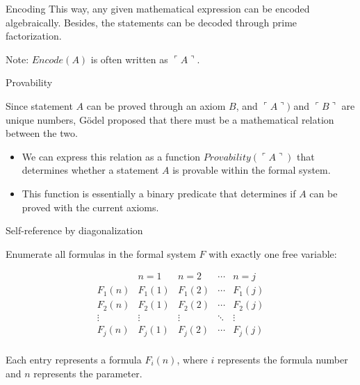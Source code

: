 \documentclass[final]{beamer}
\newlength{\colwidth}
\begin{document}
\begin{frame}[t]
\begin{columns}[t]
\begin{column}{\colwidth}
\begin{block}{Encoding}
    This way, any given mathematical expression can be encoded algebraically. Besides, the statements can be decoded through prime factorization.

    Note: $Encode(A)$ is often written as $\ulcorner \!A \urcorner$.

  \end{block}

 \begin{block}{Provability}

Since statement $A$ can be proved through an axiom $B$, and $\ulcorner \!A \urcorner)$ and $\ulcorner \!B \urcorner$ are unique numbers, Gödel proposed that there must be a mathematical relation between the two.

 \begin{itemize}
    
    \item We can express this relation as a function $Provability(\ulcorner \!A \urcorner)$ that determines whether a statement $A$ is provable within the formal system.
    
    \item This function is essentially a binary predicate that determines if $A$ can be proved with the current axioms.
    
    \end{itemize}

 \end{block}


 \begin{block}{Self-reference by diagonalization}

    Enumerate all formulas in the formal system $F$ with exactly one free variable:
    
    \[
    \begin{array}{c|c|c|c|c}
    & n=1 & n=2 & \cdots & n = j \\
    \hline
    F_1(n) & F_1(1) & F_1(2) & \cdots & F_1(j) \\
    F_2(n) & F_2(1) & F_2(2) & \cdots & F_2(j) \\
    \vdots & \vdots & \vdots & \ddots & \vdots \\
    F_j(n) & F_j(1) & F_j(2) & \cdots & F_j(j) \\
    \end{array}
    \]


Each entry represents a formula \( F_i(n) \), where \( i \) represents the formula number and \( n \) represents the parameter.
\end{block}


\end{column}
\end{columns}
\end{frame}
\end{document}
